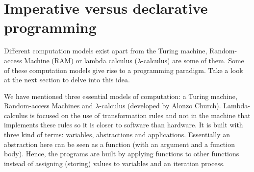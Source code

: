 % 
% 
% 
% 
% 






 
    \newpage
    \section{Imperative versus declarative programming}  \label{sec:impvsdec}

Different computation models exist apart from the Turing machine, 
Random-access Machine (RAM) or lambda calculus ($\lambda$-calculus) are some of them. 
Some of these computation models give rise to a programming paradigm. 
Take a look at the next section to delve into this idea.  

We have mentioned three essential models of computation: a Turing machine, Random-access Machines and $\lambda$-calculus (developed by Alonzo Church).
Lambda-calculus is focused on the use of transformation rules and not in the machine that implements these rules so it is closer to software than hardware.
It is built with three kind of terms: variables, abstractions and applications. 
Essentially an abstraction here can be seen as a function (with an argument and a function body). 
Hence, the programs are built by applying functions to other functions instead of assigning (storing) values to variables and an iteration process. 

